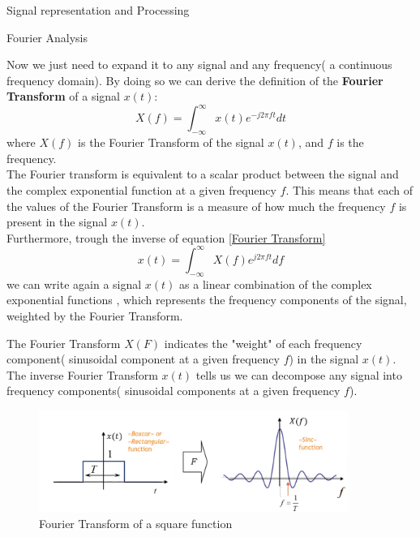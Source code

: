 \begin{section}{Signal representation and Processing}
\begin{subsection}{Fourier Analysis}
\begin{boxH}
    \end{boxH}
    Now we just need to expand it to any signal and any frequency( a continuous frequency domain).
    By doing so we can derive the definition of the \textbf{Fourier Transform} of a signal $x(t)$:
    \begin{equation}
      X(f) = \int_{-\infty}^{\infty} x(t) e^{-j2\pi ft} dt
      \label{Fourier Transform}
    \end{equation}
    where $X(f)$ is the Fourier Transform of the signal $x(t)$, and $f$ is the frequency.\\
    The Fourier transform is equivalent to a scalar product between the signal and the complex
    exponential function at a given frequency $f$. This means that each of the values of the
    Fourier Transform is a measure of how much the frequency $f$ is present in the signal $x(t)$.\\
    Furthermore, trough the inverse of equation \ref{Fourier Transform}
    \begin{equation}
      x(t) = \int_{-\infty}^{\infty} X(f) e^{j2\pi ft} df
      \label{Inverse Fourier Transform}
    \end{equation}
    we can write again a signal $x(t)$ as a linear combination of the complex exponential functions
    , which represents the frequency components of the signal, weighted by the Fourier Transform.\\
      
    \begin{boxH}
      The Fourier Transform $X(F)$ indicates the "weight" of each frequency component( sinusoidal
      component at a given frequency $f$) in the signal $x(t)$.\\
      The inverse Fourier Transform $x(t)$ tells us we can decompose any signal into frequency 
      components( sinusoidal components at a given frequency $f$).
    \end{boxH}
    
    \begin{figure}[h]
      \centering
      \includegraphics[width=0.9\textwidth]{img/fourier square function.png}
      \caption{Fourier Transform of a square function}
      \label{fig:Fourier Transform}
    \end{figure}


\end{subsection}
\end{section}
